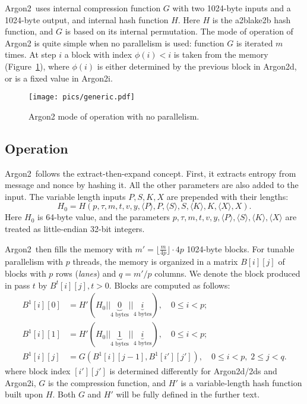 \documentclass[a4paper]{article}
\begin{document}
\textsf{Argon2}\ uses internal compression function ${G}$ with two 1024-byte inputs and a 1024-byte output, and internal hash function ${H}$. Here ${H}$ is the a2blake2b hash function, and ${G}$ is based on  its internal permutation. The mode of operation of \textsf{Argon2} is quite simple when no parallelism is used: function ${G}$ is iterated $m$ times. At step $i$ a block with index $\phi(i)<i$ is taken from the memory (Figure~\ref{fig:generic}), where $\phi(i)$ is either determined by the previous block in \textsf{Argon2d}, or is a fixed value in \textsf{Argon2i}.



\begin{figure}[ht]
  \ifpdf
\begin{center}
  \texttt{[image: pics/generic.pdf]}
  \caption{Argon2 mode of operation with no parallelism. }\label{fig:generic}
\end{center}
\fi
  \end{figure}

\subsection{Operation}

\textsf{Argon2}\ follows the extract-then-expand concept. First, it extracts entropy from message and nonce by hashing it.  All the other parameters are also added to the input. The variable length inputs $P,S,K,X$  are prepended with their lengths:
$$
H_0 = H(p,\tau,m,t,v,y,\langle P \rangle,P,\langle S \rangle,S,\langle K \rangle,K, \langle X \rangle,X).
$$
Here $H_0$ is 64-byte value, and the parameters $p,\tau,m,t,v,y,
\langle P \rangle,\langle S \rangle, \langle K \rangle,\langle X \rangle$ are treated as little-endian 32-bit integers.

\textsf{Argon2}\ then fills the memory with $m' = \lfloor \frac{m}{4p} \rfloor\cdot 4p$ 1024-byte blocks. For tunable parallelism with $p$ threads, the memory is organized in a matrix $B[i][j]$ of blocks
with $p$ rows (\emph{lanes}) and $q=m'/p$ columns. We denote the block produced in pass $t$ by $B^t[i][j],t>0$. Blocks are computed as follows:
\begin{align*}
B^1[i][0] &= H'(H_0||\underbrace{0}_{\text{4 bytes}}||\underbrace{i}_{\text{4 bytes}}),\quad 0 \leq i < p; \\
B^1[i][1] &= H'(H_0||\underbrace{1}_{\text{4 bytes}}||\underbrace{i}_{\text{4 bytes}}),\quad 0 \leq i < p;\\
B^1[i][j] &= G(B^1[i][j-1], B^1[i'][j']),\quad 0 \leq i < p,\; 2\leq j <q.
\end{align*}
where block index $[i'][j']$ is determined differently for \textsf{Argon2d/2ds} and \textsf{Argon2i},  $G$ is the compression function, and $H'$ is a variable-length hash function built upon $H$. Both $G$ and $H'$ will be fully defined in the further text. 
\end{document}
